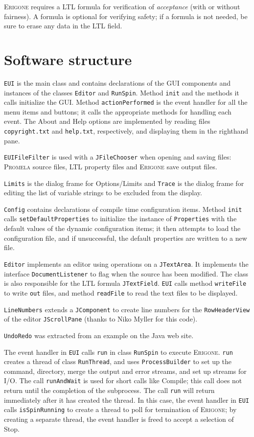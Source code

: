 \documentclass[11pt]{article}
\newcommand{\eri}{\textsc{Erigone}}
\newcommand{\prm}{\textsc{Promela}}
\newcommand{\p}[1]{\texttt{#1}}
\newcommand{\bu}[1]{\textsf{#1}}
\begin{document}
\eri{} requires a LTL formula for verification of \emph{acceptance}
(with or without fairness). A formula is optional for verifying safety;
if a formula is not needed, be sure to erase any data in the LTL field.

\newpage

\section{Software structure}

\p{EUI} is the main class and contains declarations
of the GUI components and instances
of the classes \p{Editor} and \p{RunSpin}.
Method \p{init} and the methods it calls initialize the GUI.
Method \p{action\-Per\-formed} is the event handler for all the menu items
and buttons; it calls the appropriate methods for handling each event.
The \bu{About} and \bu{Help} options are implemented by reading files
\p{copyright.txt} and \p{help.txt}, respectively, and displaying
them in the righthand pane.

\p{EUIFileFilter} is used with a \p{JFileChooser}
when opening and saving files: \prm{} source files,
LTL property files and \eri{} save output files.

\p{Limits} is the dialog frame for \bu{Options/Limits} and \p{Trace} is
the dialog frame for editing the list of variable strings to be excluded
from the display.

\p{Config} contains declarations of compile time configuration items.
Method \p{init} calls \p{set\-Default\-Properties} to initialize the instance
of \p{Properties} with the default values of the dynamic configuration
items; it then attempts to load the configuration file, and if unsuccessful,
the default properties are written to a new file.

\p{Editor} implements an editor using operations on a
\p{JTextArea}. It implements the interface \p{Document\-Listener} to flag
when the source has been modified. The class is also responsible
for the LTL formula \p{JTextField}. \p{EUI} calls method \p{writeFile}
to write \p{out} files, and method \p{readFile} to read
the text files to be displayed.

\p{LineNumbers} extends a \p{JComponent} to create line numbers
for the \p{RowHeaderView} of the editor \p{JScrollPane}
(thanks to Niko Myller for this code).

\p{UndoRedo} was extracted from an example on the Java web site.

The event handler in \p{EUI} calls \p{run} in class \p{RunSpin} to
execute \eri{}. \p{run} creates a thread of class \p{RunThread}, and
uses \p{ProcessBuilder} to set up the command, directory, merge the
output and error streams, and set up streams for I/O. The call
\p{runAndWait} is used for short calls like \bu{Compile}; this call does
not return until the completion of the subprocess. The call \p{run} will
return immediately after it has created the thread. In this case, the
event handler in \p{EUI} calls \p{isSpinRunning} to create a thread to
poll for termination of \eri{}; by creating a separate thread, the event
handler is freed to accept a selection of \bu{Stop}.
\end{document}
